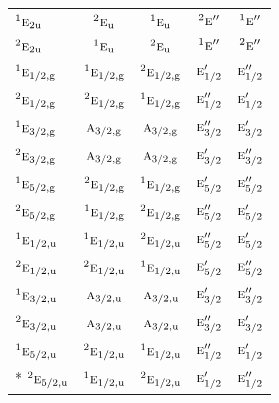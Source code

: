 \documentclass[10pt,a4paper]{article}
\numberwithin{equation}{section}
\newcommand{\irr}[1]{\text{\normalfont\scshape #1}}
\newcommand{\conjpair}[1]{{}^{#1}}
\newcommand{\ptag}[1]{\mathrm{#1}}
\begin{document}
{\begin{longtable}{@{}lcccc@{}}
$\conjpair{1}\irr{e}_{2\ptag{u}}$ & $\conjpair{2}\irr{e}_{\ptag{u}}$ & $\conjpair{1}\irr{e}_{\ptag{u}}$ & $\conjpair{2}\irr{e}''$ & $\conjpair{1}\irr{e}''$\\
$\conjpair{2}\irr{e}_{2\ptag{u}}$ & $\conjpair{1}\irr{e}_{\ptag{u}}$ & $\conjpair{2}\irr{e}_{\ptag{u}}$ & $\conjpair{1}\irr{e}''$ & $\conjpair{2}\irr{e}''$\\
$\conjpair{1}\irr{e}_{1/2,\ptag{g}}$ & $\conjpair{1}\irr{e}_{1/2,\ptag{g}}$ & $\conjpair{2}\irr{e}_{1/2,\ptag{g}}$ & $\irr{e}_{1/2}'$ & $\irr{e}_{1/2}''$\\
$\conjpair{2}\irr{e}_{1/2,\ptag{g}}$ & $\conjpair{2}\irr{e}_{1/2,\ptag{g}}$ & $\conjpair{1}\irr{e}_{1/2,\ptag{g}}$ & $\irr{e}_{1/2}''$ & $\irr{e}_{1/2}'$\\
$\conjpair{1}\irr{e}_{3/2,\ptag{g}}$ & $\irr{a}_{3/2,\ptag{g}}$ & $\irr{a}_{3/2,\ptag{g}}$ & $\irr{e}_{3/2}''$ & $\irr{e}_{3/2}'$\\
$\conjpair{2}\irr{e}_{3/2,\ptag{g}}$ & $\irr{a}_{3/2,\ptag{g}}$ & $\irr{a}_{3/2,\ptag{g}}$ & $\irr{e}_{3/2}'$ & $\irr{e}_{3/2}''$\\
$\conjpair{1}\irr{e}_{5/2,\ptag{g}}$ & $\conjpair{2}\irr{e}_{1/2,\ptag{g}}$ & $\conjpair{1}\irr{e}_{1/2,\ptag{g}}$ & $\irr{e}_{5/2}'$ & $\irr{e}_{5/2}''$\\
$\conjpair{2}\irr{e}_{5/2,\ptag{g}}$ & $\conjpair{1}\irr{e}_{1/2,\ptag{g}}$ & $\conjpair{2}\irr{e}_{1/2,\ptag{g}}$ & $\irr{e}_{5/2}''$ & $\irr{e}_{5/2}'$\\
$\conjpair{1}\irr{e}_{1/2,\ptag{u}}$ & $\conjpair{1}\irr{e}_{1/2,\ptag{u}}$ & $\conjpair{2}\irr{e}_{1/2,\ptag{u}}$ & $\irr{e}_{5/2}''$ & $\irr{e}_{5/2}'$\\
$\conjpair{2}\irr{e}_{1/2,\ptag{u}}$ & $\conjpair{2}\irr{e}_{1/2,\ptag{u}}$ & $\conjpair{1}\irr{e}_{1/2,\ptag{u}}$ & $\irr{e}_{5/2}'$ & $\irr{e}_{5/2}''$\\
$\conjpair{1}\irr{e}_{3/2,\ptag{u}}$ & $\irr{a}_{3/2,\ptag{u}}$ & $\irr{a}_{3/2,\ptag{u}}$ & $\irr{e}_{3/2}'$ & $\irr{e}_{3/2}''$\\
$\conjpair{2}\irr{e}_{3/2,\ptag{u}}$ & $\irr{a}_{3/2,\ptag{u}}$ & $\irr{a}_{3/2,\ptag{u}}$ & $\irr{e}_{3/2}''$ & $\irr{e}_{3/2}'$\\
$\conjpair{1}\irr{e}_{5/2,\ptag{u}}$ & $\conjpair{2}\irr{e}_{1/2,\ptag{u}}$ & $\conjpair{1}\irr{e}_{1/2,\ptag{u}}$ & $\irr{e}_{1/2}''$ & $\irr{e}_{1/2}'$\\*
$\conjpair{2}\irr{e}_{5/2,\ptag{u}}$ & $\conjpair{1}\irr{e}_{1/2,\ptag{u}}$ & $\conjpair{2}\irr{e}_{1/2,\ptag{u}}$ & $\irr{e}_{1/2}'$ & $\irr{e}_{1/2}''$\\
\bottomrule\end{longtable}}
\end{document}
